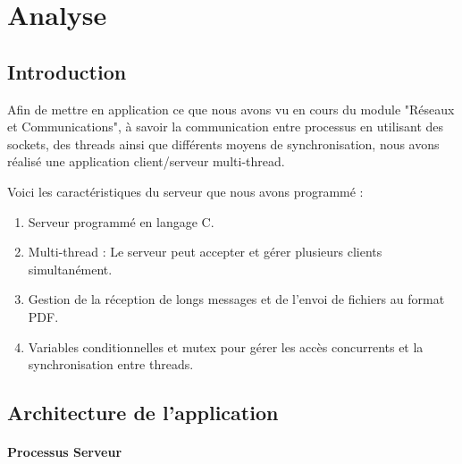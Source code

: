 \chapter{Analyse} \label{Analyse}

\section{Introduction} \label{Introduction}

Afin de mettre en application ce que nous avons vu en cours du module "Réseaux et Communications", à savoir la communication entre processus en utilisant des sockets, des threads ainsi que  différents moyens de synchronisation, nous avons réalisé une application client/serveur multi-thread.

Voici les caractéristiques du serveur que nous avons programmé :
\begin{enumerate}
\item Serveur programmé en langage C.
\item Multi-thread : Le serveur peut accepter et gérer plusieurs clients simultanément.
\item Gestion de la réception de longs messages et de l'envoi de fichiers au format PDF.
\item Variables conditionnelles et mutex pour gérer les accès concurrents et la synchronisation entre threads.
\end{enumerate}


\section{Architecture de l'application}

\subsubsection{Processus Serveur}


